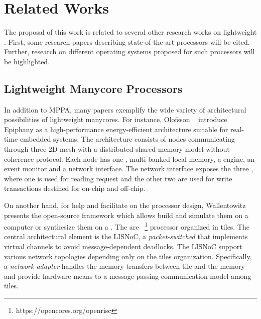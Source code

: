 \chapter{Related Works}
\label{ch.related-works}

The proposal of this work is related to several other research works
on lightweight \manycores.
First, some research papers describing state-of-the-art \manycores
processors will be cited. Further, research on different operating
systems proposed for such processors will be highlighted.

\section{Lightweight Manycore Processors}

	In addition to MPPA, many papers exemplify the wide variety of architectural
	possibilities of lightweight manycores.
	For instance, Olofsson \etal~\cite{olofsson2014} introduce Epiphany as a
	high-performance energy-efficient \manycore architecture suitable for
	real-time embedded systems.
	The architecture consists of nodes communicating through three 2D mesh \nocs
	with a distributed shared-memory model without coherence protocol.
	Each node has one \risc \cpu, multi-banked local memory, a \dma engine,
	an event monitor and a network interface.
	The network interface exposes the three \nocs, where one is used for reading
	request and the other two are used for write transactions destined for on-chip
	and off-chip.


	On another hand, for help and facilitate on the \manycore processor design,
	Wallentowitz \etal~\cite{Wallentowitz2013} presents the open-source framework
	\optimsoc which allows build \manycore \soc and simulate them on a computer or
	synthesize them on a \fpga.
	The \pes are \openrisc~\footnote{https://opencores.org/openrisc} processor
	organized in tiles.
	The central architectural element is the LISNoC, a \textit{packet-switched \noc}
	that implements virtual channels to avoid message-dependent deadlocks.
	The LISNoC support various network topologies depending only on the tiles organization.
	Specifically, a \textit{network adapter} handles the memory transfers between
	tile and the memory and provide hardware means to a message-passing communication
	model among tiles.

